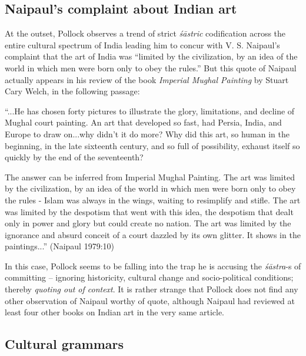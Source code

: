 \subsection{Naipaul's complaint about Indian art}\label{art12-sec3.2}

At the outset, Pollock observes a trend of strict {\sl śāstric} codiﬁcation across the entire cultural spectrum of India leading him to concur with V. S. Naipaul's complaint that the art of India was ``limited by the civilization, by an idea of the world in which men were born only to obey the rules.'' But this quote of Naipaul actually appears in his review of the book {\sl Imperial Mughal Painting} by Stuart Cary Welch, in the following passage:
\begin{myquote}
``...He has chosen forty pictures to illustrate the glory, limitations, and decline of Mughal court painting. An art that developed so fast, had Persia, India, and Europe to draw on...why didn't it do more? Why did this art, so human in the beginning, in the late sixteenth century, and so full of possibility, exhaust itself so quickly by the end of the seventeenth?

The answer can be inferred from Imperial Mughal Painting. The art was limited by the civilization, by an idea of the world in which men were born only to obey the rules - Islam was always in the wings, waiting to resimplify and stiﬂe. The art was limited by the despotism that went with this idea, the despotism that dealt only in power and glory but could create no nation. The art was limited by the ignorance and absurd conceit of a court dazzled by its own glitter. It shows in the paintings...'' (Naipaul 1979:10)
\end{myquote}

In this case, Pollock seems to be falling into the trap he is accusing the {\sl śāstra}-s of committing -- ignoring historicity, cultural change and socio-political conditions; thereby {\sl quoting out of context}. It is rather strange that Pollock does not ﬁnd any other observation of Naipaul worthy of quote, although Naipaul had reviewed at least four other books on Indian art in the very same article.

\subsection{Cultural grammars}\label{art12-sec3.3}

